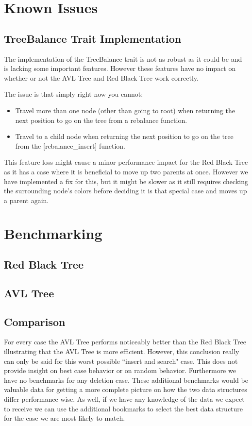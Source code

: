 \documentclass[11pt, letterpaper]{article}
\begin{document}
\section{Known Issues}

\subsection{TreeBalance Trait Implementation}
The implementation of the TreeBalance trait is not as robust as it could be and is lacking some important features.
However these features have no impact on whether or not the AVL Tree and Red Black Tree work correctly.

\noindent The issue is that simply right now you cannot:
\begin{itemize}
    \item Travel more than one node (other than going to root) when returning the next position to go on the tree from a rebalance function.
    \item Travel to a child node when returning the next position to go on the tree from the [rebalance\_insert] function.
\end{itemize}

This feature loss might cause a minor performance impact for the Red Black Tree as it has a case where it is beneficial
to move up two parents at once.  However we have implemented a fix for this, but it might be slower as it still requires
checking the surrounding node's colors before deciding it is that special case and moves up a parent again.

\section{Benchmarking}

\subsection{Red Black Tree}

\subsection{AVL Tree}

\subsection{Comparison}
For every case the AVL Tree performs noticeably better than the Red Black Tree illustrating that the AVL Tree is more efficient.
However, this conclusion really can only be said for this worst possible ``insert and search" case.  This does not provide insight on best case behavior or on random behavior.
Furthermore we have no benchmarks for any deletion case.  These additional benchmarks would be valuable data for getting a more complete picture on how
the two data structures differ performance wise.  As well, if we have any knowledge of the data we expect to receive we can use the additional bookmarks to select the best data structure for the
case we are most likely to match.
\end{document}
